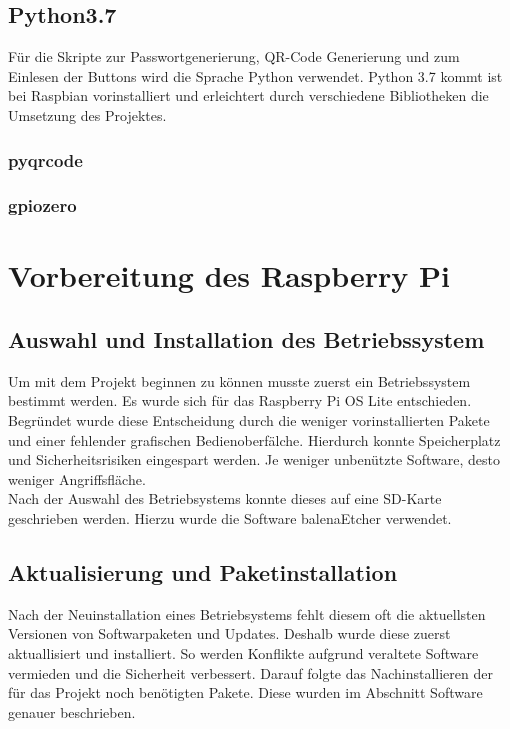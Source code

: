 \documentclass[a4paper,11pt,singlespacing]{article}
\begin{document}
    		\subsection{Python3.7}
    			Für die Skripte zur Passwortgenerierung, QR-Code Generierung und zum Einlesen der Buttons wird die Sprache Python verwendet. Python 3.7 kommt ist bei Raspbian vorinstalliert und erleichtert durch verschiedene Bibliotheken die Umsetzung des Projektes.
    			\subsubsection{pyqrcode}
    			\subsubsection{gpiozero}
    	
    	
    	\section{Vorbereitung des Raspberry Pi}
    	\subsection{Auswahl und Installation des Betriebssystem}
    	    Um mit dem Projekt beginnen zu können musste zuerst ein Betriebssystem bestimmt werden.
        	Es wurde sich für das Raspberry Pi OS Lite entschieden. Begründet wurde diese Entscheidung  durch die weniger vorinstallierten Pakete und einer fehlender grafischen Bedienoberfälche. Hierdurch konnte Speicherplatz und Sicherheitsrisiken eingespart werden. Je weniger unbenützte Software, desto weniger Angriffsfläche. \\ 
    	
        	Nach der Auswahl des Betriebsystems konnte dieses auf eine SD-Karte geschrieben werden.
        	Hierzu wurde die Software balenaEtcher verwendet.   
    	
    	
    	\subsection{Aktualisierung und Paketinstallation}
        	Nach der Neuinstallation eines Betriebsystems fehlt diesem oft die aktuellsten Versionen von Softwarpaketen und Updates. Deshalb wurde diese zuerst aktuallisiert und installiert. So werden Konflikte aufgrund veraltete Software vermieden und die Sicherheit verbessert.  
        	Darauf folgte das Nachinstallieren der für das Projekt noch benötigten Pakete. Diese wurden im Abschnitt Software genauer beschrieben. 
    	
\end{document}
